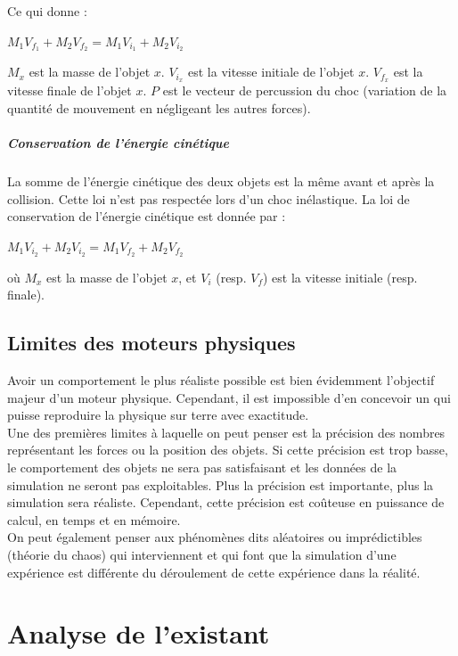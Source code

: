 \documentclass{report}
\begin{document}
Ce qui donne :

\(M_1V_{f_1} + M_2V_{f_2} = M_1V_{i_1}+M_2V_{i_2}\)

\(M_x\) est la masse de l’objet \(x\).
\(V_{i_x}\) est la vitesse initiale de l’objet \(x\).
\(V_{f_x}\) est la vitesse finale de l’objet \(x\).
\(P\) est le vecteur de percussion du choc (variation de la quantité de mouvement en négligeant les autres forces).

\paragraph*{Conservation de l'énergie cinétique}

La somme de l’énergie cinétique des deux objets est la même avant et après la collision. Cette loi n'est pas respectée lors d'un choc inélastique.
La loi de conservation de l'énergie cinétique est donnée par :

\(M_1V_{i_2} + M_2V_{i_2} = M_1V_{f_2} + M_2V_{f_2}\)

où \(M_x\) est la masse de l’objet \(x\), et \(V_i\) (resp. \(V_f\)) est la vitesse initiale (resp. finale).

\newpage
\section{Limites des moteurs physiques}

Avoir un comportement le plus réaliste possible est bien évidemment l’objectif majeur d’un moteur physique. Cependant, il est impossible d'en concevoir un qui puisse reproduire la physique sur terre avec exactitude. \\

Une des premières limites à laquelle on peut penser est la précision des nombres représentant les forces ou la position des objets. Si cette précision est trop basse, le comportement des objets ne sera pas satisfaisant et les données de la simulation ne seront pas exploitables. Plus la précision est importante, plus la simulation sera réaliste. Cependant, cette précision est coûteuse en puissance de calcul, en temps et en mémoire. \\

On peut également penser aux phénomènes dits aléatoires ou imprédictibles (théorie du chaos) qui interviennent et qui font que la simulation d’une expérience est différente du déroulement de cette expérience dans la réalité.

\chapter{Analyse de l'existant}
\end{document}
